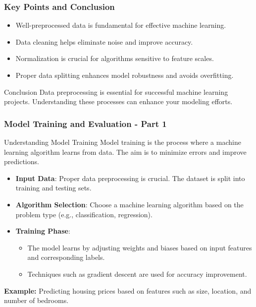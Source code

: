 \documentclass[aspectratio=169]{beamer}
\begin{document}
\begin{frame}[fragile]
    \frametitle{Key Points and Conclusion}
    \begin{itemize}
        \item Well-preprocessed data is fundamental for effective machine learning.
        \item Data cleaning helps eliminate noise and improve accuracy.
        \item Normalization is crucial for algorithms sensitive to feature scales.
        \item Proper data splitting enhances model robustness and avoids overfitting.
    \end{itemize}

    \begin{block}{Conclusion}
        Data preprocessing is essential for successful machine learning projects. Understanding these processes can enhance your modeling efforts.
    \end{block}
\end{frame}

\begin{frame}[fragile]
    \frametitle{Model Training and Evaluation - Part 1}
    
    \begin{block}{Understanding Model Training}
        Model training is the process where a machine learning algorithm learns from data. The aim is to minimize errors and improve predictions.
    \end{block}
    
    \begin{itemize}
        \item \textbf{Input Data}: Proper data preprocessing is crucial. The dataset is split into training and testing sets.
        \item \textbf{Algorithm Selection}: Choose a machine learning algorithm based on the problem type (e.g., classification, regression).
        \item \textbf{Training Phase}:
            \begin{itemize}
                \item The model learns by adjusting weights and biases based on input features and corresponding labels.
                \item Techniques such as gradient descent are used for accuracy improvement.
            \end{itemize}
    \end{itemize}
    
    \textbf{Example:} Predicting housing prices based on features such as size, location, and number of bedrooms.
\end{frame}
\end{document}
